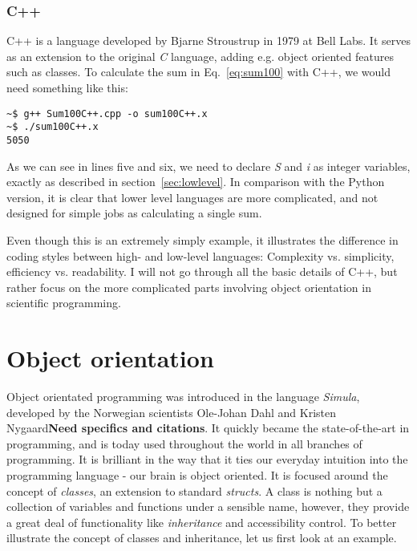 \subsubsection{C++}

C++ is a language developed by Bjarne Stroustrup in 1979 at Bell Labs. It serves as an extension to the original \textit{C} language, adding e.g. object oriented features such as classes. To calculate the sum in Eq.~\ref{eq:sum100} with C++, we would need something like this:

\vspace{0.5 cm}


\begin{verbatim}
~$ g++ Sum100C++.cpp -o sum100C++.x
~$ ./sum100C++.x 
5050
\end{verbatim}


As we can see in lines five and six, we need to declare \textit{S} and \textit{i} as integer variables, exactly as described in section~\ref{sec:lowlevel}. In comparison with the Python version, it is clear that lower level languages are more complicated, and not designed for simple jobs as calculating a single sum.

Even though this is an extremely simply example, it illustrates the difference in coding styles between high- and low-level languages: Complexity vs. simplicity, efficiency vs. readability. I will not go through all the basic details of C++, but rather focus on the more complicated parts involving object orientation in scientific programming.


\section{Object orientation}

Object orientated programming was introduced in the language \textit{Simula}, developed by the Norwegian scientists Ole-Johan Dahl and Kristen Nygaard\textbf{Need specifics and citations}. It quickly became the state-of-the-art in programming, and is today used throughout the world in all branches of programming. It is brilliant in the way that it ties our everyday intuition into the programming language - our brain is object oriented. It is focused around the concept of \textit{classes}, an extension to standard \textit{structs}. A class is nothing but a collection of variables and functions under a sensible name, however, they provide a great deal of functionality like \textit{inheritance} and accessibility control. To better illustrate the concept of classes and inheritance, let us first look at an example.

